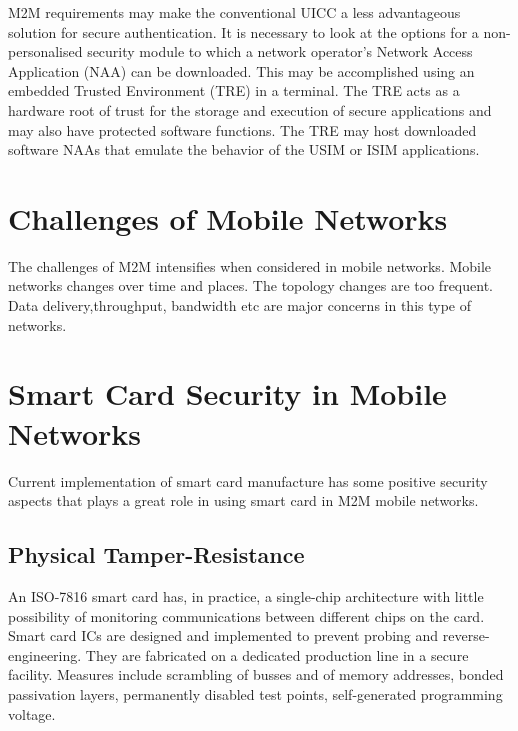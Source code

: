 \documentclass[12pt]{article}
\begin{document}
M2M requirements may make the conventional UICC a less advantageous solution for secure authentication. It is necessary to look at the options for a non-personalised security module to which a network operator’s Network Access Application (NAA) can be downloaded. This may be accomplished using an embedded Trusted Environment (TRE) in a terminal. The TRE acts as a hardware root of trust for the storage and execution of secure applications and may also have protected software functions. The TRE may host downloaded software NAAs that emulate the behavior of the USIM  or ISIM  applications.

\section{Challenges of Mobile Networks}
The challenges of M2M intensifies when considered in mobile networks. Mobile networks changes over time and places. The topology changes are too frequent. Data delivery,throughput, bandwidth etc are major concerns in this type of networks. 


\section{Smart Card Security in Mobile Networks}
Current implementation of smart card manufacture has some positive security aspects that plays a great role in using smart card in M2M mobile networks.
\subsection{Physical Tamper-Resistance}
An ISO-7816  smart card has, in practice, a single-chip architecture with little possibility of monitoring communications between different chips on the card. Smart card ICs are designed and implemented to prevent probing and reverse-engineering. They are fabricated on a dedicated production line in a secure facility. Measures include scrambling of busses and of memory addresses, bonded passivation layers, permanently disabled test points, self-generated programming voltage.
\end{document}
